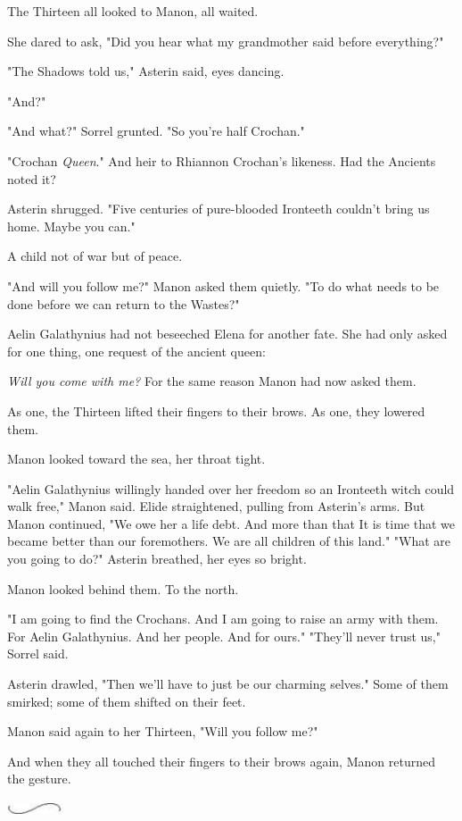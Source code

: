 The Thirteen all looked to Manon, all waited.

She dared to ask, "Did you hear what my grandmother said before
 everything?"

"The Shadows told us," Asterin said, eyes dancing.

"And?"

"And what?" Sorrel grunted. "So you're half Crochan."

"Crochan \emph{Queen}." And heir to Rhiannon Crochan's likeness. Had the Ancients noted it?

Asterin shrugged. "Five centuries of pure-blooded Ironteeth couldn't bring us home. Maybe you can."

A child not of war  but of peace.

"And will you follow me?" Manon asked them quietly. "To do what needs to be done before we can return to the Wastes?"

Aelin Galathynius had not beseeched Elena for another fate. She had only asked for one thing, one request of the ancient queen:

\emph{Will you come with me?} For the same reason Manon had now asked them.

As one, the Thirteen lifted their fingers to their brows. As one, they lowered them.

Manon looked toward the sea, her throat tight.

"Aelin Galathynius willingly handed over her freedom so an Ironteeth witch could walk free," Manon said. Elide straightened, pulling from Asterin's arms. But Manon continued, "We owe her a life debt. And more than that  It is time that we became better than our foremothers. We are all children of this land." "What are you going to do?" Asterin breathed, her eyes so bright.

Manon looked behind them. To the north.

"I am going to find the Crochans. And I am going to raise an army with them. For Aelin Galathynius. And her people. And for ours." "They'll never trust us," Sorrel said.

Asterin drawled, "Then we'll have to just be our charming selves." Some of them smirked; some of them shifted on their feet.

Manon said again to her Thirteen, "Will you follow me?"

And when they all touched their fingers to their brows again, Manon returned the gesture.

\includegraphics[width=0.65in,height=0.13in]{images/seperator}

